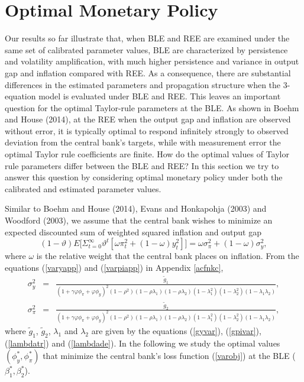\section{Optimal Monetary Policy}
\label{sec:MonPol}

Our results so far illustrate that, when BLE and REE are examined under the same set of calibrated parameter values, BLE are characterized by persistence and volatility amplification, with much higher persistence and variance in output gap and inflation compared with REE. As a consequence, there are substantial differences in the estimated parameters and propagation structure when the 3-equation model is evaluated under BLE and REE. This leaves an important question for the optimal Taylor-rule parameters at the BLE. As shown in Boehm and House (2014), at the REE when the output gap and
inflation are observed without error, it is typically optimal to respond infinitely strongly to observed deviation from the central bank's targets, while with measurement error the optimal Taylor rule coefficients are finite.
How do the optimal values of Taylor rule parameters differ between the BLE and REE? In this section we try to answer this question by considering optimal monetary policy under both the calibrated and estimated parameter values. 

Similar to Boehm and House (2014), Evans and Honkapohja (2003) and Woodford (2003), we assume that the central bank wishes to minimize an expected discounted sum of weighted squared inflation and output gap
\begin{equation}
(1-\vartheta)E\Big[\Sigma_{t=0}^\infty \vartheta^t[\omega\pi_t^2+(1-\omega)y_t^2] \Big]=\omega\sigma_\pi^2+(1-\omega)\sigma_y^2,\label{varobj}
\end{equation}
where $\omega$ is the relative weight that the central bank places on inflation. From the equations (\ref{varyapp}) and (\ref{varpiapp}) in Appendix \ref{acfnkc},
\begin{eqnarray}
\sigma_y^2&=&\frac{\widetilde{g}_1}{(1+\gamma\varphi\phi_\pi+\varphi\phi_y)^2(1-\rho^2)(1-\rho\lambda_1)(1-\rho\lambda_2)(1-\lambda_1^2)(1-\lambda_2^2)(1-\lambda_1\lambda_2)}, \label{varyc}\\
\sigma_\pi^2&=&\frac{\widetilde{g}_2}{(1+\gamma\varphi\phi_\pi+\varphi\phi_y)^2(1-\rho^2)(1-\rho\lambda_1)(1-\rho\lambda_2)(1-\lambda_1^2)(1-\lambda_2^2)(1-\lambda_1\lambda_2)}, \label{varpic}
\end{eqnarray}
where $\widetilde{g}_1$, $\widetilde{g}_2$, $\lambda_1$ and $\lambda_2$ are given by the equations (\ref{gyvar}), (\ref{gpivar}), (\ref{lambdatr}) and (\ref{lambdade}). In the following we study the optimal values  $(\phi_y^*, \phi_\pi^*)$ that minimize the central bank's loss function (\ref{varobj}) at the BLE   ($\beta_1^*, \beta_2^*$).

